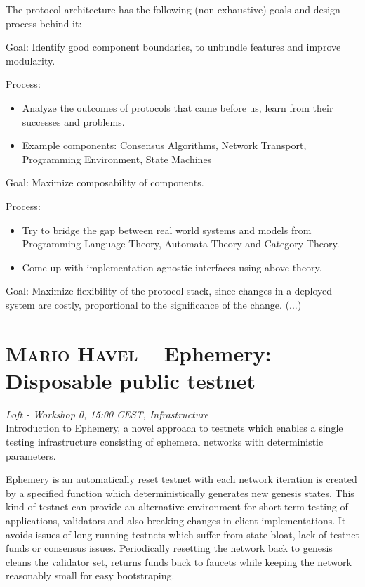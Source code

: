 The protocol architecture has the following (non-exhaustive) goals and design process behind it:

Goal: Identify good component boundaries, to unbundle features and improve modularity.

\noindent Process:
\begin{itemize}
\item Analyze the outcomes of protocols that came before us, learn from their successes and problems.
\item Example components: Consensus Algorithms, Network Transport, Programming Environment, State Machines
\end{itemize}

Goal: Maximize composability of components.

\noindent Process:
\begin{itemize}
\item Try to bridge the gap between real world systems and models from Programming Language Theory, Automata Theory and Category Theory.
\item Come up with implementation agnostic interfaces using above theory.
\end{itemize}

Goal: Maximize flexibility of the protocol stack, since changes in a deployed system are costly, proportional to the significance of the change.
(...)\clearpage
\section {\textsc{Mario Havel} -- Ephemery: Disposable public testnet
} \noindent \textit {Loft - Workshop 0, 15:00 CEST, Infrastructure
}\\[1em] Introduction to Ephemery, a novel approach to testnets which enables a single testing infrastructure consisting of ephemeral networks with deterministic parameters.
\par Ephemery is an automatically reset testnet with each network iteration is created by a specified function which deterministically generates new genesis states. This kind of testnet can provide an alternative environment for short-term testing of applications, validators and also breaking changes in client implementations. It avoids issues of long running testnets which suffer from state bloat, lack of testnet funds or consensus issues. Periodically resetting the network back to genesis cleans the validator set, returns funds back to faucets while keeping the network reasonably small for easy bootstraping.


